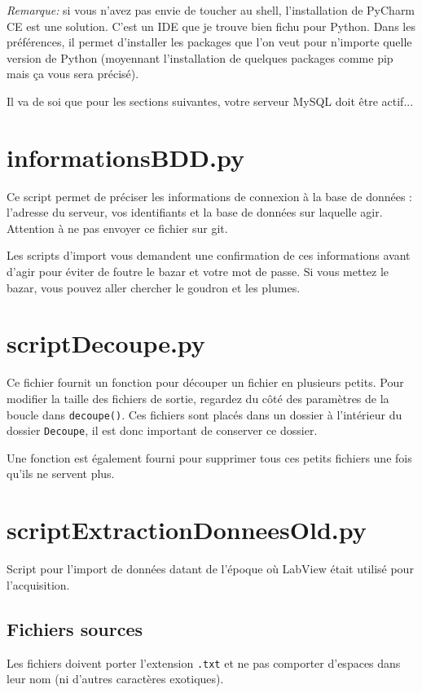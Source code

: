 \documentclass{MyReportClass}
\begin{document}
\vspace{1em}

\emph{Remarque:} si vous n'avez pas envie de toucher au shell, l'installation de PyCharm CE est une solution. C'est un IDE que je trouve bien fichu pour Python. Dans les préférences, il permet d'installer les packages que l'on veut pour n'importe quelle version de Python (moyennant l'installation de quelques packages comme pip mais ça vous sera précisé).

Il va de soi que pour les sections suivantes, votre serveur MySQL doit être actif...

\section{informationsBDD.py}
Ce script permet de préciser les informations de connexion à la base de données : l'adresse du serveur, vos identifiants et la base de données sur laquelle agir. Attention à ne pas envoyer ce fichier sur git.

Les scripts d'import vous demandent une confirmation de ces informations avant d'agir pour éviter de foutre le bazar et votre mot de passe. Si vous mettez le bazar, vous pouvez aller chercher le goudron et les plumes.

\section{scriptDecoupe.py}

Ce fichier fournit un fonction pour découper un fichier en plusieurs petits. Pour modifier la taille des fichiers de sortie, regardez du côté des paramètres de la boucle dans \verb?decoupe()?. Ces fichiers sont placés dans un dossier à l'intérieur du dossier \verb?Decoupe?, il est donc important de conserver ce dossier.

Une fonction est également fourni pour supprimer tous ces petits fichiers une fois qu'ils ne servent plus.

\section{scriptExtractionDonneesOld.py}

Script pour l'import de données datant de l'époque où LabView était utilisé pour l'acquisition.

\subsection{Fichiers sources}
Les fichiers doivent porter l'extension \verb?.txt? et ne pas comporter d'espaces dans leur nom (ni d'autres caractères exotiques).
\end{document}
